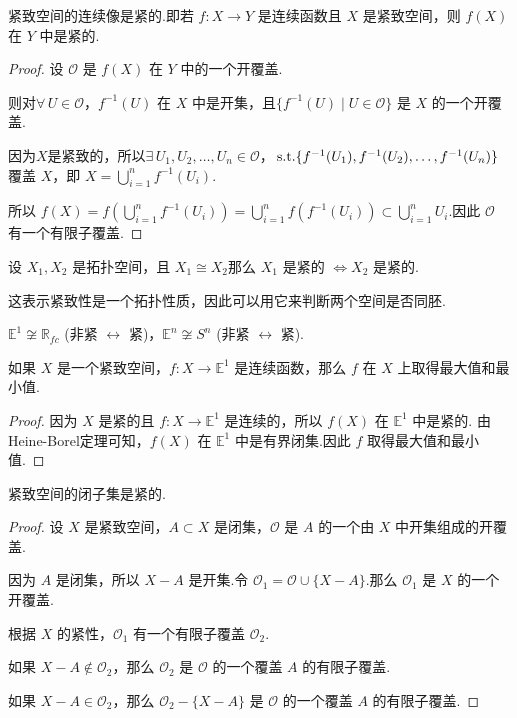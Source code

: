 \begin{proposition}[紧致空间的连续像紧][prop:6.1]
    紧致空间的连续像是紧的.即若 $f: X \to Y$ 是连续函数且 $X$ 是紧致空间，则 $f(X)$ 在 $Y$ 中是紧的.
\end{proposition}
\begin{proof}
    设 $\mathcal{O}$ 是 $f(X)$ 在 $Y$ 中的一个开覆盖.\par
    则对$\forall\, U \in \mathcal{O}$，$f^{-1}(U)$ 在 $X$ 中是开集，且$\{f^{-1}(U) \mid U \in \mathcal{O}\}$ 是 $X$ 的一个开覆盖.\par
    因为$X$是紧致的，所以$\exists\, U_1, U_2, \dots, U_n \in \mathcal{O}$，$\operatorname{\,\text{s.t.}} \{f^{-1}(U_1), f^{-1}(U_2), \dots, f^{-1}(U_n)\}$ 覆盖 $X$，即 $X = \bigcup_{i=1}^n f^{-1}(U_i)$.\par
    所以 $f(X) = f\left(\bigcup_{i=1}^n f^{-1}(U_i)\right) = \bigcup_{i=1}^n f(f^{-1}(U_i)) \subset \bigcup_{i=1}^n U_i$.因此 $\mathcal{O}$ 有一个有限子覆盖.
\end{proof}

\begin{corollary}[同胚保持紧性][cor:6.1]
    设 $X_1, X_2$ 是拓扑空间，且 $X_1 \cong X_2$那么 $X_1$ 是紧的 $\iff X_2$ 是紧的.
\end{corollary}
这表示紧致性是一个拓扑性质，因此可以用它来判断两个空间是否同胚.

\begin{instance}
    $\mathbb{E}^1 \not\cong \mathbb{R}_{fc}$ (非紧 $\leftrightarrow$ 紧)，$\mathbb{E}^n \not\cong S^n$ (非紧 $\leftrightarrow$ 紧).
\end{instance}

\begin{theorem}[极值定理][thm:6.1]
    如果 $X$ 是一个紧致空间，$f: X \to \mathbb{E}^1$ 是连续函数，那么 $f$ 在 $X$ 上取得最大值和最小值.
\end{theorem}
\begin{proof}
    因为 $X$ 是紧的且 $f: X \to \mathbb{E}^1$ 是连续的，所以 $f(X)$ 在 $\mathbb{E}^1$ 中是紧的.
    由Heine-Borel定理可知，$f(X)$ 在 $\mathbb{E}^1$ 中是有界闭集.因此 $f$ 取得最大值和最小值.
\end{proof}

\begin{proposition}[紧空间的闭子集紧][prop:6.2]
    紧致空间的闭子集是紧的.
\end{proposition}
\begin{proof}
    设 $X$ 是紧致空间，$A \subset X$ 是闭集，$\mathcal{O}$ 是 $A$ 的一个由 $X$ 中开集组成的开覆盖.\par
    因为 $A$ 是闭集，所以 $X-A$ 是开集.令 $\mathcal{O}_1 = \mathcal{O} \cup \{X-A\}$.那么 $\mathcal{O}_1$ 是 $X$ 的一个开覆盖.\par
    根据 $X$ 的紧性，$\mathcal{O}_1$ 有一个有限子覆盖 $\mathcal{O}_2$.\par
    如果 $X-A \notin \mathcal{O}_2$，那么 $\mathcal{O}_2$ 是 $\mathcal{O}$ 的一个覆盖 $A$ 的有限子覆盖.\par
    如果 $X-A \in \mathcal{O}_2$，那么 $\mathcal{O}_2 - \{X-A\}$ 是 $\mathcal{O}$ 的一个覆盖 $A$ 的有限子覆盖.
\end{proof}

